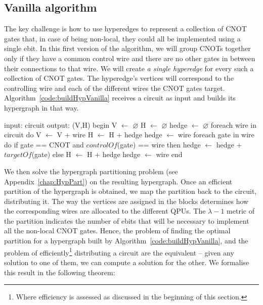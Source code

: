 \subsection{Vanilla algorithm}
\label{Vanilla}

The key challenge is how to use hyperedges to represent a collection of CNOT gates that, in case of being non-local, they could all be implemented using a single ebit. In this first version of the algorithm, we will group CNOTs together only if they have a common control wire and there are no other gates in between their connections to that wire. We will create \textit{a single hyperedge} for every such a collection of CNOT gates. The hyperedge's vertices will correspond to the controlling wire and each of the different wires the CNOT gates target. Algorithm~\ref{code:buildHypVanilla} receives a circuit as input and builds its hypergraph in that way. 

\begin{algorithm}[caption={Builds the hypergraph of a given circuit. \(H\) may contain multiple hyperedges connecting the same vertices. This algorithm runs in time \(O(g)\), where \(g\) is the number of gates in the input circuit.}, label={code:buildHypVanilla}]
input: circuit
output: (V,H)
begin
  V $\gets$ $\varnothing$
  H $\gets$ $\varnothing$
  hedge $\gets$ $\varnothing$
  foreach wire in circuit do
    V $\gets$ V $+$ {wire}
    H $\gets$ H $+$ {hedge}
    hedge $\gets$ {wire}
    foreach gate in wire do
      if gate == CNOT and $controlOf$(gate) == wire then
        hedge $\gets$ hedge $+$ {$targetOf$(gate)}
      else
        H $\gets$ H $+$ {hedge}
        hedge $\gets$ {wire}
end
\end{algorithm}


We then solve the hypergraph partitioning problem (see Appendix~\ref{chap:HypPart}) on the resulting hypergraph. Once an efficient partition of the hypergraph is obtained, we map the partition back to the circuit, distributing it. The way the vertices are assigned in the blocks determines how the corresponding wires are allocated to the different QPUs. The \(\lambda-1\) metric of the partition indicates the number of ebits that will be necessary to implement all the non-local CNOT gates. Hence, the problem of finding the optimal partition for a hypergraph built by Algorithm~\ref{code:buildHypVanilla}, and the problem of efficiently\footnote{Where efficiency is assessed as discussed in the beginning of this section.} distributing a circuit are the equivalent -- given any solution to one of them, we can compute a solution for the other. We formalise this result in the following theorem:

